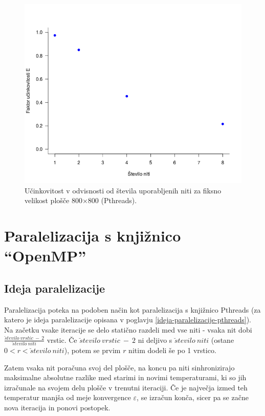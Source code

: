 \documentclass[a4paper,titlepage,11pt]{article}
\begin{document}
\begin{figure}[H]
\begin{center}
\includegraphics[scale=0.5]{graf-rezultati-2_3.png}
\caption{Učinkovitost v odvisnosti od števila uporabljenih niti za fiksno velikost plošče 800$\times$800 (Pthreads).}
\label{graf-rezultati-ucinkovitost}
\end{center}
\vspace{-25pt}
\end{figure}

\pagebreak

\section{Paralelizacija s knjižnico ``OpenMP''}

\subsection{Ideja paralelizacije}
Paralelizacija poteka na podoben način kot paralelizacija s knjižnico Pthreads (za katero je ideja paralelizacije opisana v poglavju \ref{ideja-paralelizacije-pthreads}). Na začetku vsake iteracije se delo statično razdeli med vse niti - vsaka nit dobi $\frac{\breve{s}tevilo \ vrstic \ - \ 2}{\breve{s}tevilo \ niti}$ vrstic. Če $\breve{s}tevilo \ vrstic \ - \ 2$ ni deljivo s $\breve{s}tevilo \ niti$ (ostane $0 < r < \breve{s}tevilo \ niti$), potem se prvim $r$ nitim dodeli še po 1 vrstico.

Zatem vsaka nit poračuna svoj del plošče, na koncu pa niti sinhronizirajo maksimalne absolutne razlike med starimi in novimi temperaturami, ki so jih izračunale na svojem delu plošče v trenutni iteraciji. Če je največja izmed teh temperatur manjša od meje konvergence $\varepsilon$, se izračun konča, sicer pa se začne nova iteracija in ponovi postopek.
\end{document}
